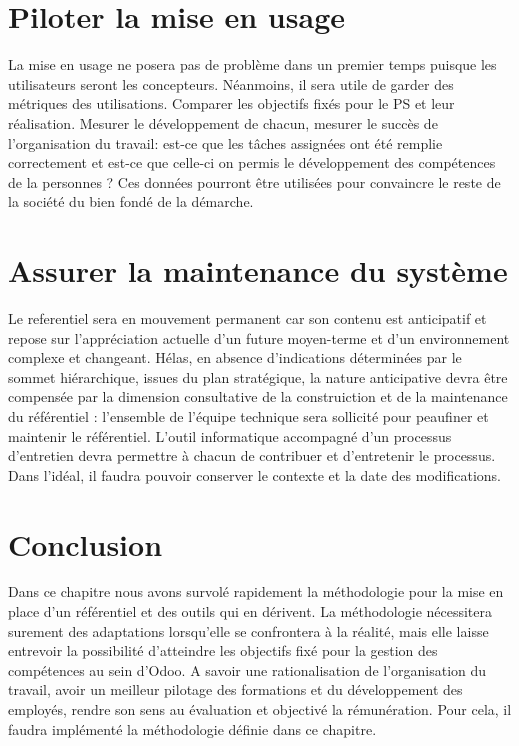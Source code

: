 \section{Piloter la mise en usage}
La mise en usage ne posera pas de problème dans un premier temps puisque les utilisateurs seront les concepteurs. Néanmoins, il sera utile de garder des métriques des utilisations. Comparer les objectifs fixés pour le PS et leur réalisation. Mesurer le développement de chacun, mesurer le succès de l'organisation du travail: est-ce que les tâches assignées ont été remplie correctement et est-ce que celle-ci on permis le développement des compétences de la personnes ? Ces données pourront être utilisées pour convaincre le reste de la société du bien fondé de la démarche. 

\section{Assurer la maintenance du système}
 Le referentiel sera en mouvement permanent car son contenu est anticipatif et repose sur l’appréciation actuelle d’un future moyen-terme et d’un environnement complexe et changeant. Hélas, en absence d'indications déterminées par le sommet hiérarchique, issues du plan stratégique, la nature anticipative devra être compensée par la dimension consultative de la construiction et de la maintenance du référentiel : l’ensemble de l’équipe technique sera sollicité pour peaufiner et maintenir le référentiel. L'outil informatique accompagné d'un processus d'entretien devra permettre à chacun de contribuer et d'entretenir le processus. Dans l'idéal, il faudra pouvoir conserver le contexte et la date des modifications.
 
 
 \section{Conclusion}
 Dans ce chapitre nous avons survolé rapidement la méthodologie pour la mise en place d'un référentiel et des outils qui en dérivent. La méthodologie nécessitera surement des adaptations lorsqu'elle se confrontera à la réalité, mais elle laisse entrevoir la possibilité d'atteindre les objectifs fixé pour la gestion des compétences au sein d'Odoo. A savoir une rationalisation de l'organisation du travail, avoir un meilleur pilotage des formations et du développement des employés, rendre son sens au évaluation et objectivé la rémunération. Pour cela, il faudra implémenté la méthodologie définie dans ce chapitre.



